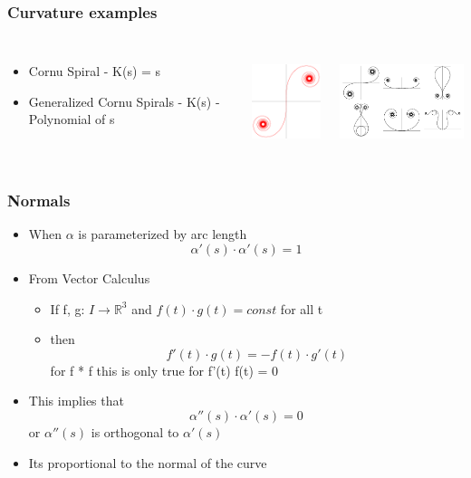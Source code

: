 \documentclass[10pt]{beamer}
\begin{document}
\begin{frame}
  \frametitle{Curvature examples}
  \begin{columns}
    \column{7cm}
    \begin{itemize}
    \item Cornu Spiral - K(s) = s
    \item Generalized Cornu Spirals - K(s) - Polynomial of s
    \end{itemize}
    \column{4cm}
    \centerline{\includegraphics[height=3cm]{CornuSpiral}}
    \centerline{\includegraphics[height=3cm]{CornuPolynomialSpirals}}
  \end{columns}
\end{frame}

\begin{frame}
  \frametitle{Normals}
  \begin{itemize}
  \item When $\alpha$ is parameterized by arc length
    \[
      \alpha'(s) \cdot \alpha'(s) = 1
    \]
  \item From Vector Calculus
    \begin{itemize}
    \item If f, g: $I \rightarrow \mathbb{R}^3$ and $f(t) \cdot  g(t) = const$ for all t
    \item then
      \[ f'(t) \cdot g(t) = -f(t) \cdot g'(t) \] for f * f this is only true for f'(t) f(t) = 0
    \end{itemize}
  \item This implies that
    \[ \alpha''(s) \cdot  \alpha'(s) = 0 \]
    or $\alpha''(s)$ is orthogonal to $\alpha'(s)$
  \item Its proportional to the normal of the curve
  \end{itemize}
\end{frame}
\end{document}
